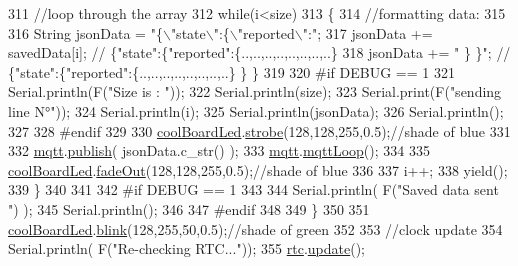\begin{DoxyCode}
311         \textcolor{comment}{//loop through the array}
312         \textcolor{keywordflow}{while}(i<size)
313         \{
314             \textcolor{comment}{//formatting data:}
315         
316             String jsonData = \textcolor{stringliteral}{"\{\(\backslash\)"state\(\backslash\)":\{\(\backslash\)"reported\(\backslash\)":"};
317             jsonData += savedData[i]; \textcolor{comment}{// \{"state":\{"reported":\{..,..,..,..,..,..,..,..\}}
318             jsonData += \textcolor{stringliteral}{" \} \}"}; \textcolor{comment}{// \{"state":\{"reported":\{..,..,..,..,..,..,..,..\}  \} \}}
319 
320 \textcolor{preprocessor}{        #if DEBUG == 1 }
321             Serial.println(F(\textcolor{stringliteral}{"Size is : "}));
322             Serial.println(size);
323             Serial.print(F(\textcolor{stringliteral}{"sending line N°"}));
324             Serial.println(i);
325             Serial.println(jsonData);
326             Serial.println();
327 
328 \textcolor{preprocessor}{        #endif}
329 
330             \hyperlink{class_cool_board_a1b1d3c684a5baa56b08486e192fd8e97}{coolBoardLed}.\hyperlink{class_cool_board_led_ad5f0de4c628cbfbf49896042831c64ad}{strobe}(128,128,255,0.5);\textcolor{comment}{//shade of blue}
331         
332             \hyperlink{class_cool_board_a2399f44d7c23c1149a335cb3b46d90f1}{mqtt}.\hyperlink{class_cool_m_q_t_t_ace977b3e90ab14b1199fe5c4fb0a13ec}{publish}( jsonData.c\_str() );
333             \hyperlink{class_cool_board_a2399f44d7c23c1149a335cb3b46d90f1}{mqtt}.\hyperlink{class_cool_m_q_t_t_aa5eaae967b562b62cbcf2b8d81f6e5d5}{mqttLoop}();
334         
335             \hyperlink{class_cool_board_a1b1d3c684a5baa56b08486e192fd8e97}{coolBoardLed}.\hyperlink{class_cool_board_led_a93d545679237e8cc858324367149775c}{fadeOut}(128,128,255,0.5);\textcolor{comment}{//shade of blue}
336             
337             i++;
338             yield();
339         \}       
340 
341 
342 \textcolor{preprocessor}{    #if DEBUG == 1}
343 
344         Serial.println( F(\textcolor{stringliteral}{"Saved data sent "}) );
345         Serial.println();
346     
347 \textcolor{preprocessor}{    #endif}
348 
349     \}
350 
351     \hyperlink{class_cool_board_a1b1d3c684a5baa56b08486e192fd8e97}{coolBoardLed}.\hyperlink{class_cool_board_led_a96e1ea13003eee34c9dbcef340404426}{blink}(128,255,50,0.5);\textcolor{comment}{//shade of green}
352 
353     \textcolor{comment}{//clock update}
354     Serial.println( F(\textcolor{stringliteral}{"Re-checking RTC..."}));
355     \hyperlink{class_cool_board_a50d2a6716879d64a85f3c6b44ad63275}{rtc}.\hyperlink{class_cool_time_aae601f795452cfa48d9fb337aed483a8}{update}();

\end{DoxyCode}
